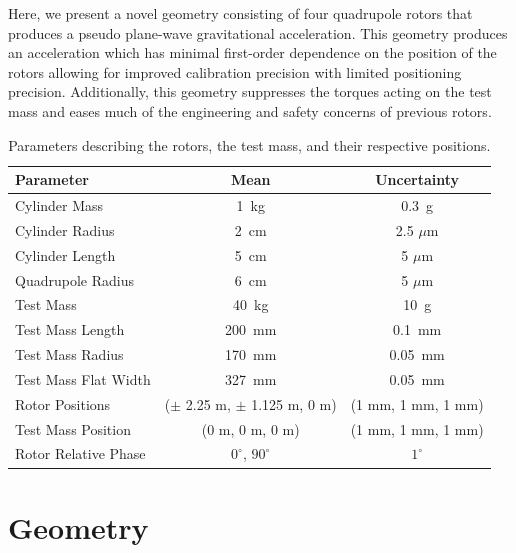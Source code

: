 \documentclass[superscriptaddress, twocolumn, prd]{revtex4-1}
\begin{document}
Here, we present a novel geometry consisting of four quadrupole rotors that produces a pseudo plane-wave gravitational acceleration. This geometry produces an acceleration which has minimal first-order dependence on the position of the rotors allowing for improved calibration precision with limited positioning precision. Additionally, this geometry suppresses the torques acting on the test mass and eases much of the engineering and safety concerns of previous rotors.

\begin{widetext}
\begingroup
\setlength{\tabcolsep}{10pt} %
\renewcommand{\arraystretch}{1.5} %

\begin{table}[h!]
\begin{center}
\begin{tabular}{ |l|c|c| }
\hline
 Parameter & Mean & Uncertainty \\
 \hline
Cylinder Mass & 1~kg & 0.3~g \\
Cylinder Radius & 2~cm & 2.5 $\mu$m \\
Cylinder Length & 5~cm & 5 $\mu$m \\
Quadrupole Radius & 6~cm & 5 $\mu$m \\
Test Mass & 40~kg & 10~g \\
Test Mass Length & 200~mm & 0.1~mm\\
Test Mass Radius & 170~mm & 0.05~mm\\
Test Mass Flat Width & 327~mm & 0.05~mm\\
Rotor Positions & ($\pm$ 2.25 m, $\pm$ 1.125 m, 0 m) & (1 mm, 1 mm, 1 mm) \\
Test Mass Position & (0 m, 0 m, 0 m) & (1 mm, 1 mm, 1 mm) \\
Rotor Relative Phase & $0^\circ$, $90^\circ$ & $1^\circ$ \\
 \hline

 \end{tabular}
 \caption{Parameters describing the rotors, the test mass, and their respective positions.}\label{param}
 \end{center}

\end{table}
\endgroup
\end{widetext}

\section{Geometry}
\end{document}

